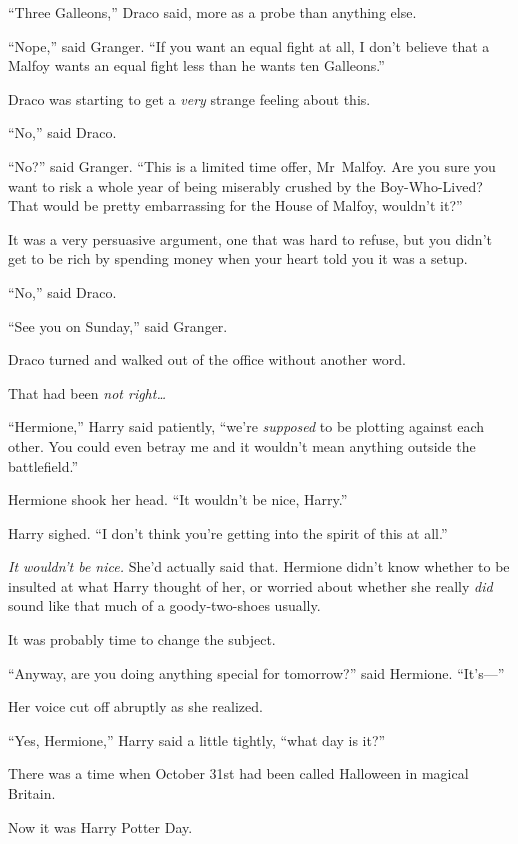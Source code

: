 “Three Galleons,” Draco said, more as a probe than anything else.

“Nope,” said Granger.
“If you want an equal fight at all, I don’t believe that a Malfoy wants an equal fight less than he wants ten Galleons.”

Draco was starting to get a \emph{very} strange feeling about this.

“No,” said Draco.

“No?” said Granger.
“This is a limited time offer, Mr~Malfoy. Are you sure you want to risk a whole year of being miserably crushed by the Boy-Who-Lived? That would be pretty embarrassing for the House of Malfoy, wouldn’t it?”

It was a very persuasive argument, one that was hard to refuse, but you didn’t get to be rich by spending money when your heart told you it was a setup.

“No,” said Draco.

“See you on Sunday,” said Granger.

Draco turned and walked out of the office without another word.

That had been \emph{not right…}

\later

“Hermione,” Harry said patiently, “we’re \emph{supposed} to be plotting against each other. You could even betray me and it wouldn’t mean anything outside the battlefield.”

Hermione shook her head.
“It wouldn’t be nice, Harry.”

Harry sighed.
“I don’t think you’re getting into the spirit of this at all.”

\emph{It wouldn’t be nice.} She’d actually said that. Hermione didn’t know whether to be insulted at what Harry thought of her, or worried about whether she really \emph{did} sound like that much of a goody-two-shoes usually.

It was probably time to change the subject.

“Anyway, are you doing anything special for tomorrow?” said Hermione.
“It’s—”

Her voice cut off abruptly as she realized.

“Yes, Hermione,” Harry said a little tightly, “what day is it?”


There was a time when October 31st had been called Halloween in magical Britain.

Now it was Harry Potter Day.

